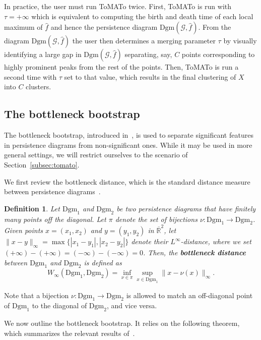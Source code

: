 \documentclass[10pt]{article} %
\theoremstyle{plain}
\newtheorem{definition}[theorem]{Definition}
\newcommand{\RR}{\mathbb{R}}
\newcommand{\GG}{\mathcal{G}}
\newcommand{\tom}{ToMATo\xspace}
\newcommand{\bneck}[2]{W_{\infty}(#1,#2)}
\newcommand{\dgm}{\mathrm{Dgm}}
\begin{document}
In practice, the user must run \tom twice.
First, \tom is run with \(\tau=+\infty\) which is equivalent to computing the birth and death time of each local maximum of \(\hat{f}\) and hence the persistence diagram \(\dgm(\GG, \hat{f})\). From the diagram \(\dgm(\GG, \hat{f})\) the user then determines a merging parameter \(\tau\) by visually identifying a large gap in \(\dgm(\GG, \hat{f})\) separating, say, \(C\) points corresponding to highly prominent peaks from the rest of the points.
Then, \tom is run a second time with \(\tau\) set to that value, which results in the final clustering of \(X\) into \(C\) clusters.

\subsection{The bottleneck bootstrap}\label{subsec:bottleneck_bootstrap}

The bottleneck bootstrap, introduced in~\citet[Section 6]{chazal_bottleneck_bootstrap}, is used to separate significant features in persistence diagrams from non-significant ones. While it may be used in more general settings, we will restrict ourselves to the scenario of Section~\ref{subsec:tomato}.

We first review the bottleneck distance, which is the standard distance measure between persistence diagrams~\citep{EH10, chazal:hal-01330678}.
\begin{definition}
Let \(\dgm_{1}\) and \(\dgm_{2}\) be two persistence diagrams that have finitely many points off the diagonal. Let \(\pi\) denote the set of bijections \(\nu \colon\dgm_{1}\to\dgm_{2}\). Given points \(x=(x_{1}, x_{2})\) and \(y=(y_{1}, y_{2})\) in \(\overline{\RR}^{2}\), let \(\|x-y\|_\infty=\max\{|x_1-y_1|, |x_2-y_2|\}\) denote their \(L^{\infty}\)-distance, where we set \((+\infty)-(+\infty)=(-\infty)-(-\infty)=0\).
Then, the \textbf{bottleneck distance} between \(\dgm_{1}\) and \(\dgm_{2}\) is defined as \[
\bneck{\dgm_{1}}{\dgm_{2}} =\displaystyle\inf_{\nu\in\pi}\sup_{x\in\dgm_{1}} \|x-\nu(x)\|_\infty.
\]
\end{definition}
Note that a bijection \(\nu \colon\dgm_{1}\to\dgm_{2}\) is allowed to match an off-diagonal point of \(\dgm_{1}\) to the diagonal of \(\dgm_{2}\), and vice versa.

We now outline the bottleneck bootstrap. It relies on the following theorem, which summarizes the relevant results of~\citet[Section 6]{chazal_bottleneck_bootstrap}.
\end{document}
